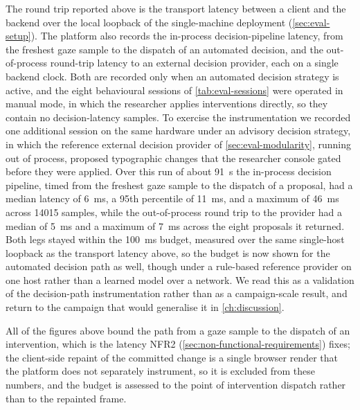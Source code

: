 The round trip reported above is the transport latency between a client and the backend over the local loopback of the single-machine deployment (\cref{sec:eval-setup}).
The platform also records the in-process decision-pipeline latency, from the freshest gaze sample to the dispatch of an automated decision, and the out-of-process round-trip latency to an external decision provider, each on a single backend clock.
Both are recorded only when an automated decision strategy is active, and the eight behavioural sessions of \cref{tab:eval-sessions} were operated in manual mode, in which the researcher applies interventions directly, so they contain no decision-latency samples.
To exercise the instrumentation we recorded one additional session on the same hardware under an advisory decision strategy, in which the reference external decision provider of \cref{sec:eval-modularity}, running out of process, proposed typographic changes that the researcher console gated before they were applied.
Over this run of about \SI{91}{\second} the in-process decision pipeline, timed from the freshest gaze sample to the dispatch of a proposal, had a median latency of \SI{6}{\milli\second}, a 95th percentile of \SI{11}{\milli\second}, and a maximum of \SI{46}{\milli\second} across \num{14015} samples, while the out-of-process round trip to the provider had a median of \SI{5}{\milli\second} and a maximum of \SI{7}{\milli\second} across the eight proposals it returned.
Both legs stayed within the \SI{100}{\milli\second} budget, measured over the same single-host loopback as the transport latency above, so the budget is now shown for the automated decision path as well, though under a rule-based reference provider on one host rather than a learned model over a network.
We read this as a validation of the decision-path instrumentation rather than as a campaign-scale result, and return to the campaign that would generalise it in \cref{ch:discussion}.

All of the figures above bound the path from a gaze sample to the dispatch of an intervention, which is the latency NFR2 (\cref{sec:non-functional-requirements}) fixes; the client-side repaint of the committed change is a single browser render that the platform does not separately instrument, so it is excluded from these numbers, and the budget is assessed to the point of intervention dispatch rather than to the repainted frame.

